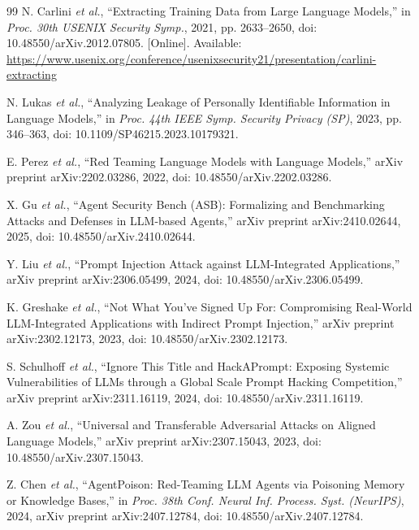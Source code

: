 \documentclass{ieeeaccess}
\begin{document}
\begin{thebibliography}{99}
N. Carlini \emph{et al.}, ``Extracting Training Data from Large Language Models,'' in \emph{Proc. 30th USENIX Security Symp.}, 2021, pp. 2633--2650, doi: 10.48550/arXiv.2012.07805. [Online]. Available: \url{https://www.usenix.org/conference/usenixsecurity21/presentation/carlini-extracting}

N. Lukas \emph{et al.}, ``Analyzing Leakage of Personally Identifiable Information in Language Models,'' in \emph{Proc. 44th IEEE Symp. Security Privacy (SP)}, 2023, pp. 346--363, doi: 10.1109/SP46215.2023.10179321.

E. Perez \emph{et al.}, ``Red Teaming Language Models with Language Models,'' arXiv preprint arXiv:2202.03286, 2022, doi: 10.48550/arXiv.2202.03286.

X. Gu \emph{et al.}, ``Agent Security Bench (ASB): Formalizing and Benchmarking Attacks and Defenses in LLM-based Agents,'' arXiv preprint arXiv:2410.02644, 2025, doi: 10.48550/arXiv.2410.02644.

Y. Liu \emph{et al.}, ``Prompt Injection Attack against LLM-Integrated Applications,'' arXiv preprint arXiv:2306.05499, 2024, doi: 10.48550/arXiv.2306.05499.

K. Greshake \emph{et al.}, ``Not What You've Signed Up For: Compromising Real-World LLM-Integrated Applications with Indirect Prompt Injection,'' arXiv preprint arXiv:2302.12173, 2023, doi: 10.48550/arXiv.2302.12173.

S. Schulhoff \emph{et al.}, ``Ignore This Title and HackAPrompt: Exposing Systemic Vulnerabilities of LLMs through a Global Scale Prompt Hacking Competition,'' arXiv preprint arXiv:2311.16119, 2024, doi: 10.48550/arXiv.2311.16119.

A. Zou \emph{et al.}, ``Universal and Transferable Adversarial Attacks on Aligned Language Models,'' arXiv preprint arXiv:2307.15043, 2023, doi: 10.48550/arXiv.2307.15043.

Z. Chen \emph{et al.}, ``AgentPoison: Red-Teaming LLM Agents via Poisoning Memory or Knowledge Bases,'' in \emph{Proc. 38th Conf. Neural Inf. Process. Syst. (NeurIPS)}, 2024, arXiv preprint arXiv:2407.12784, doi: 10.48550/arXiv.2407.12784.


\end{thebibliography}
\end{document}
